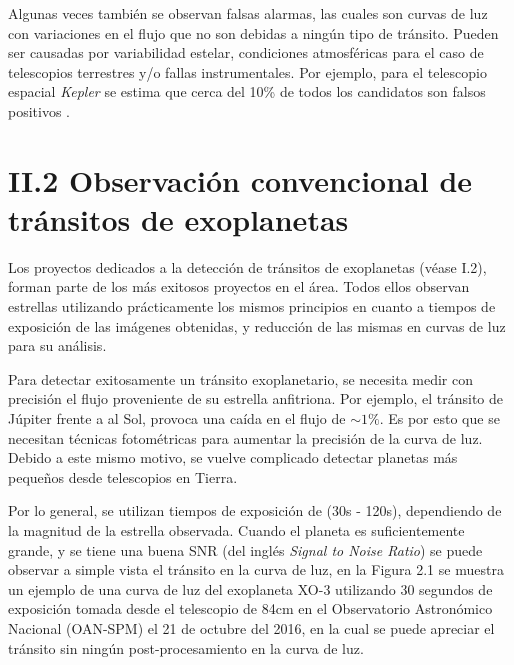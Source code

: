 Algunas veces también se observan falsas alarmas, las cuales son curvas de luz con variaciones en el flujo que no son debidas a ningún tipo de tránsito. Pueden ser causadas por variabilidad estelar, condiciones atmosféricas para el caso de telescopios terrestres y/o fallas instrumentales. Por ejemplo, para el telescopio espacial \textit{Kepler} se estima que cerca del 10\% de todos los candidatos son falsos positivos \cite{fressin2013false}.


\section*{II.2 Observación convencional de tránsitos de exoplanetas}

Los proyectos dedicados a la detección de tránsitos de exoplanetas (véase I.2), forman parte de los más exitosos proyectos en el área. Todos ellos observan estrellas utilizando prácticamente los mismos principios en cuanto a tiempos de exposición de las imágenes obtenidas, y reducción de las mismas en curvas de luz para su análisis.

Para detectar exitosamente un tránsito exoplanetario, se necesita medir con precisión el flujo proveniente de su estrella anfitriona. Por ejemplo, el tránsito de Júpiter frente a al Sol, provoca una caída en el flujo de $\sim 1\%$. Es por esto que se necesitan técnicas fotométricas para aumentar la precisión de la curva de luz. Debido a este mismo motivo, se vuelve complicado detectar planetas más pequeños desde telescopios en Tierra.

Por lo general, se utilizan tiempos de exposición de (30s - 120s), dependiendo de la magnitud de la estrella observada. Cuando el planeta es suficientemente grande, y se tiene una buena SNR (del inglés \textit{Signal to Noise Ratio}) se puede observar a simple vista el tránsito en la curva de luz, en la Figura 2.1 se muestra un ejemplo de una curva de luz del exoplaneta XO-3 \cite{johns2008xo} utilizando 30 segundos de exposición tomada desde el telescopio de 84cm en el Observatorio Astronómico Nacional (OAN-SPM) el 21 de octubre del 2016, en la cual se puede apreciar el tránsito sin ningún post-procesamiento en la curva de luz.

